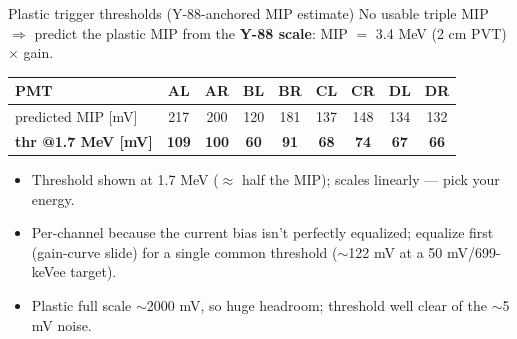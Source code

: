 \documentclass[aspectratio=169,10pt]{beamer}
\begin{document}
\begin{frame}{Plastic trigger thresholds (Y-88-anchored MIP estimate)}
No usable triple MIP $\Rightarrow$ predict the plastic MIP from the \textbf{Y-88
scale}: MIP $=$ 3.4 MeV (2 cm PVT) $\times$ gain.
\vspace{1ex}
\begin{center}\small
\begin{tabular}{lcccccccc}
\toprule
PMT & AL & AR & BL & BR & CL & CR & DL & DR \\
\midrule
predicted MIP [mV]        & 217 & 200 & 120 & 181 & 137 & 148 & 134 & 132 \\
\textbf{thr @1.7 MeV [mV]} & \textbf{109} & \textbf{100} & \textbf{60} & \textbf{91} & \textbf{68} & \textbf{74} & \textbf{67} & \textbf{66} \\
\bottomrule
\end{tabular}
\end{center}
\vspace{1ex}
\begin{itemize}
\item Threshold shown at 1.7 MeV ($\approx$ half the MIP); scales linearly ---
      pick your energy.
\item Per-channel because the current bias isn't perfectly equalized; equalize
      first (gain-curve slide) for a single common threshold ($\sim$122 mV at a
      50 mV/699-keVee target).
\item Plastic full scale $\sim$2000 mV, so huge headroom; threshold well clear
      of the $\sim$5 mV noise.
\end{itemize}
\end{frame}
\end{document}
